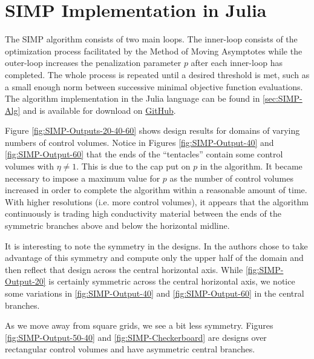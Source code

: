 \section{SIMP Implementation in Julia}

The SIMP algorithm consists of two main loops. The inner-loop consists of the optimization process facilitated by the Method of Moving Asymptotes while the outer-loop increases the penalization parameter $p$ after each inner-loop has completed. The whole process is repeated until a desired threshold is met, such as a small enough norm between successive minimal objective function evaluations. The algorithm implementation in the Julia language can be found in \ref{sec:SIMP-Alg} and is available for download on \href{https://github.com/mikwnelson/julia-simp-optimization}{GitHub}.

Figure \ref{fig:SIMP-Outputs-20-40-60} shows design results for domains of varying numbers of control volumes. Notice in Figures \ref{fig:SIMP-Output-40} and \ref{fig:SIMP-Output-60} that the ends of the ``tentacles'' contain some control volumes with $\eta\neq 1$. This is due to the cap put on $p$ in the algorithm. It became necessary to impose a maximum value for $p$ as the number of control volumes increased in order to complete the algorithm within a reasonable amount of time. With higher resolutions (i.e. more control volumes), it appears that the algorithm continuously is trading high conductivity material between the ends of the symmetric branches above and below the horizontal midline.

It is interesting to note the symmetry in the designs. In \cite{Marck2012} the authors chose to take advantage of this symmetry and compute only the upper half of the domain and then reflect that design across the central horizontal axis. While \ref{fig:SIMP-Output-20} is certainly symmetric across the central horizontal axis, we notice some variations in \ref{fig:SIMP-Output-40} and \ref{fig:SIMP-Output-60} in the central branches.

As we move away from square grids, we see a bit less symmetry. Figures \ref{fig:SIMP-Output-50-40} and \ref{fig:SIMP-Checkerboard} are designs over rectangular control volumes and have asymmetric central branches.

